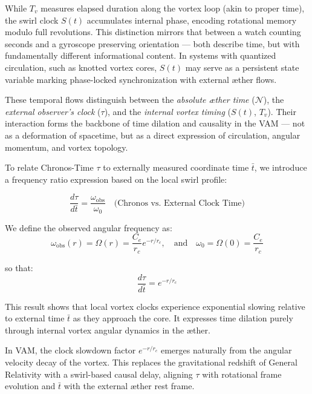 \begin{tcolorbox}[colback=gray!5, colframe=black!70, sharp corners=southwest, title=Temporal Phase vs. Duration]
    While \(T_v\) measures elapsed duration along the vortex loop (akin to proper time), the swirl clock \(S(t)\) accumulates internal phase, encoding rotational memory modulo full revolutions. This distinction mirrors that between a watch counting seconds and a gyroscope preserving orientation — both describe time, but with fundamentally different informational content. In systems with quantized circulation, such as knotted vortex cores, \(S(t)\) may serve as a persistent state variable marking phase-locked synchronization with external æther flows.
\end{tcolorbox}


\noindent
These temporal flows distinguish between the \emph{absolute æther time} (\(\mathcal{N}\)), the \emph{external observer’s clock} (\(\tau\)), and the \emph{internal vortex timing} (\(S(t)\), \(T_v\)). Their interaction forms the backbone of time dilation and causality in the VAM — not as a deformation of spacetime, but as a direct expression of circulation, angular momentum, and vortex topology.

\medskip
To relate Chronos-Time $\tau$ to externally measured coordinate time $\bar{t}$, we introduce a frequency ratio expression based on the local swirl profile:

\begin{equation}
    \frac{d\tau}{d\bar{t}} = \frac{\omega_{\text{obs}}}{\omega_0}
    \quad \text{(Chronos vs. External Clock Time)}
\end{equation}

We define the observed angular frequency as:
\[
    \omega_{\text{obs}}(r) = \Omega(r) = \frac{C_e}{r_c} e^{-r/r_c}, \quad \text{and} \quad \omega_0 = \Omega(0) = \frac{C_e}{r_c}
\]

so that:
\[
    \frac{d\tau}{d\bar{t}} = e^{-r/r_c}
\]

This result shows that local vortex clocks experience exponential slowing relative to external time $\bar{t}$ as they approach the core. It expresses time dilation purely through internal vortex angular dynamics in the æther.

\begin{tcolorbox}[colback=gray!7, colframe=black!60, sharp corners=southwest, title=Frequency-Based Time Flow Interpretation]
    In VAM, the clock slowdown factor $e^{-r/r_c}$ emerges naturally from the angular velocity decay of the vortex. This replaces the gravitational redshift of General Relativity with a swirl-based causal delay, aligning $\tau$ with rotational frame evolution and $\bar{t}$ with the external æther rest frame.
\end{tcolorbox}

